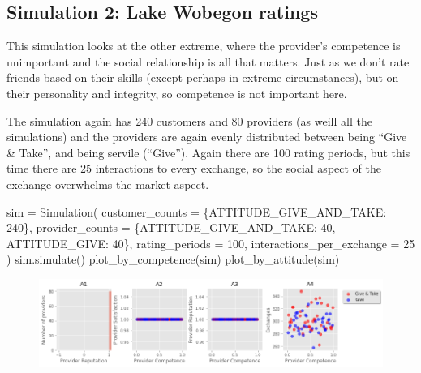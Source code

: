 \documentclass[
  letterpaper,
  DIV=11,
  numbers=noendperiod]{scrartcl}
\newenvironment{Shaded}{\begin{snugshade}}{\end{snugshade}}
\newcommand{\DecValTok}[1]{\textcolor[rgb]{0.68,0.00,0.00}{#1}}
\newcommand{\NormalTok}[1]{\textcolor[rgb]{0.00,0.23,0.31}{#1}}
\newcommand{\OperatorTok}[1]{\textcolor[rgb]{0.37,0.37,0.37}{#1}}
\begin{document}
\hypertarget{simulation-2-lake-wobegon-ratings}{%
\subsection{Simulation 2: Lake Wobegon
ratings}\label{simulation-2-lake-wobegon-ratings}}

This simulation looks at the other extreme, where the provider's
competence is unimportant and the social relationship is all that
matters. Just as we don't rate friends based on their skills (except
perhaps in extreme circumstances), but on their personality and
integrity, so competence is not important here.

The simulation again has 240 customers and 80 providers (as weill all
the simulations) and the providers are again evenly distributed between
being ``Give \& Take'', and being servile (``Give''). Again there are
100 rating periods, but this time there are 25 interactions to every
exchange, so the social aspect of the exchange overwhelms the market
aspect.

\begin{Shaded}
\begin{Highlighting}[]
\NormalTok{sim }\OperatorTok{=}\NormalTok{ Simulation(}
\NormalTok{    customer\_counts }\OperatorTok{=}\NormalTok{ \{ATTITUDE\_GIVE\_AND\_TAKE: }\DecValTok{240}\NormalTok{\},}
\NormalTok{    provider\_counts }\OperatorTok{=}\NormalTok{ \{ATTITUDE\_GIVE\_AND\_TAKE: }\DecValTok{40}\NormalTok{, ATTITUDE\_GIVE: }\DecValTok{40}\NormalTok{\},}
\NormalTok{    rating\_periods }\OperatorTok{=} \DecValTok{100}\NormalTok{,}
\NormalTok{    interactions\_per\_exchange }\OperatorTok{=} \DecValTok{25}
\NormalTok{    )}
\NormalTok{sim.simulate()}
\NormalTok{plot\_by\_competence(sim)}
\NormalTok{plot\_by\_attitude(sim)}
\end{Highlighting}
\end{Shaded}

\begin{figure}[H]

{\centering \includegraphics{provider-reputation_files/figure-pdf/cell-12-output-1.png}

}

\end{figure}
\end{document}
